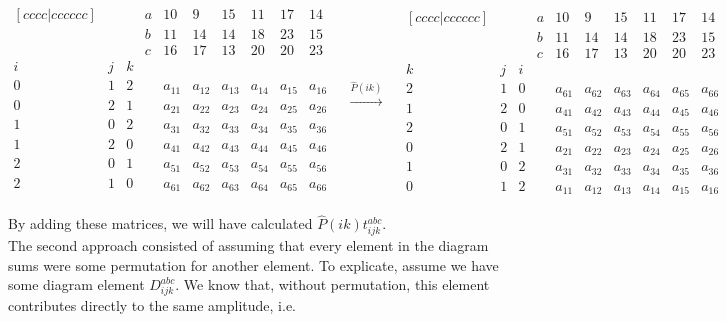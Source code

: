 \documentclass[10pt,twoside]{report}
\begin{document}
	\begin{equation*}
	\begin{matrix}[cccc|cccccc]
	&   &   & a & 10 & 9  & 15 & 11 & 17 & 14\\
	&   &   & b & 11 & 14 & 14 & 18 & 23 & 15\\
	&   &   & c & 16 & 17 & 13 & 20 & 20 & 23\\
	i & j & k &   &    &    &    &    &    &   \\ \hline
	0 & 1 & 2 & & a_{11} & a_{12} & a_{13} & a_{14} & a_{15} & a_{16}\\
	0 & 2 & 1 & & a_{21} & a_{22} & a_{23} & a_{24} & a_{25} & a_{26}\\
	1 & 0 & 2 & & a_{31} & a_{32} & a_{33} & a_{34} & a_{35} & a_{36}\\
	1 & 2 & 0 & & a_{41} & a_{42} & a_{43} & a_{44} & a_{45} & a_{46}\\
	2 & 0 & 1 & & a_{51} & a_{52} & a_{53} & a_{54} & a_{55} & a_{56}\\
	2 & 1 & 0 & & a_{61} & a_{62} & a_{63} & a_{64} & a_{65} & a_{66}\\
	\end{matrix}
	\quad\overset{\hat{P}(ik)}{\longrightarrow}\quad
	\begin{matrix}[cccc|cccccc]
	&   &   & a & 10 & 9  & 15 & 11 & 17 & 14\\
	&   &   & b & 11 & 14 & 14 & 18 & 23 & 15\\
	&   &   & c & 16 & 17 & 13 & 20 & 20 & 23\\
	k & j & i &   &    &    &    &    &    &   \\ \hline
	2 & 1 & 0 & & a_{61} & a_{62} & a_{63} & a_{64} & a_{65} & a_{66}\\
	1 & 2 & 0 & & a_{41} & a_{42} & a_{43} & a_{44} & a_{45} & a_{46}\\
	2 & 0 & 1 & & a_{51} & a_{52} & a_{53} & a_{54} & a_{55} & a_{56}\\
	0 & 2 & 1 & & a_{21} & a_{22} & a_{23} & a_{24} & a_{25} & a_{26}\\
	1 & 0 & 2 & & a_{31} & a_{32} & a_{33} & a_{34} & a_{35} & a_{36}\\
	0 & 1 & 2 & & a_{11} & a_{12} & a_{13} & a_{14} & a_{15} & a_{16}
	\end{matrix}
	\end{equation*}
	
	By adding these matrices, we will have calculated $\hat{P}(ik)t_{ijk}^{abc}$.\\
	
	The second approach consisted of assuming that every element in the diagram sums were some permutation for another element. To explicate, assume we have some diagram element $D_{ijk}^{abc}$. We know that, without permutation, this element contributes directly to the same amplitude, i.e.
	
\end{document}
